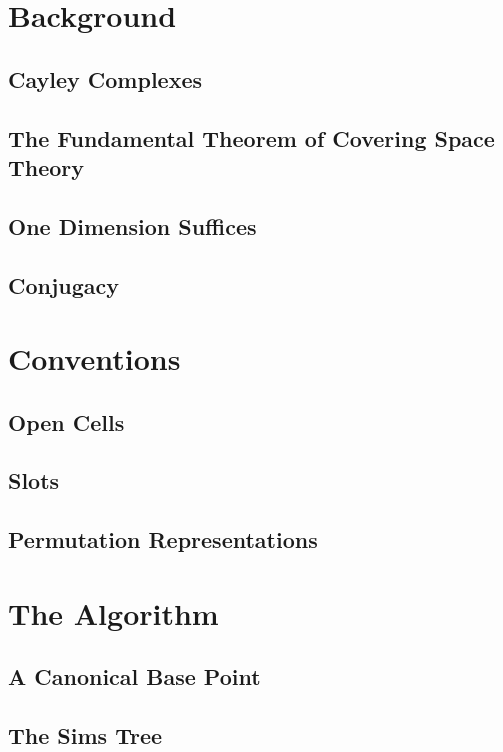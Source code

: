 \documentclass[12pt]{article}
\begin{document}
\section{Background}

\subsection{Cayley Complexes}

\subsection{The Fundamental Theorem of Covering Space Theory}

\subsection{One Dimension Suffices}

\subsection{Conjugacy}

\section{Conventions}

\subsection{Open Cells}

\subsection{Slots}

\subsection{Permutation Representations}

\section{The Algorithm}

\subsection{A Canonical Base Point}

\subsection{The Sims Tree}
\end{document}
